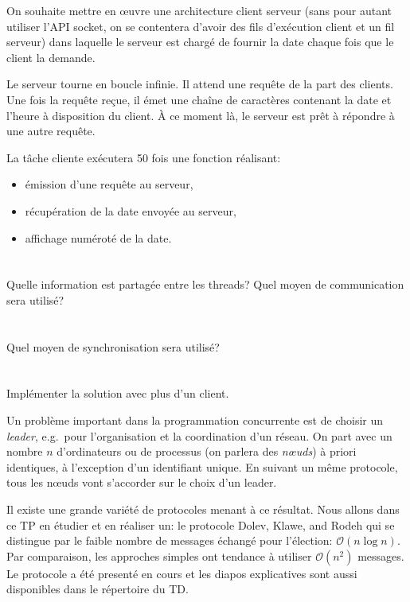 \documentclass{exam}
\begin{document}
\begin{questions}
\begin{solution}
  \inputminted{C}{correc/julia.c}
\end{solution}

On souhaite mettre en \oe{}uvre une architecture client serveur (sans pour
autant utiliser l'API socket, on se contentera d'avoir des fils d'exécution
client et un fil serveur) dans laquelle le serveur est chargé de
fournir la date chaque fois que le client la demande.

Le serveur tourne en boucle infinie. Il attend une requête de la part des
clients. Une fois la requête reçue, il émet une chaîne de caractères contenant
la date et l'heure à disposition du client. À ce moment là, le serveur est
prêt à répondre à une autre requête.

La tâche cliente exécutera 50 fois une fonction réalisant:
\begin{itemize}
  \item émission d'une requête au serveur,
  \item récupération de la date envoyée au serveur,
  \item affichage numéroté de la date.
\end{itemize}
\begin{parts}
  \part{} Quelle information est partagée entre les threads? Quel moyen de
  communication sera utilisé?
  \part{} Quel moyen de synchronisation sera utilisé?
  \part{} Implémenter la solution avec plus d'un client.
\end{parts}

Un problème important dans la programmation concurrente est de choisir
un \emph{leader}, e.g.\ pour l'organisation et la coordination d'un
réseau. On part avec un nombre $n$ d'ordinateurs ou de processus (on
parlera des \emph{nœuds}) à priori identiques, à l'exception d'un
identifiant unique. En suivant un même protocole, tous les nœuds vont
s'accorder sur le choix d'un leader.

Il existe une grande variété de protocoles menant à ce résultat.  Nous
allons dans ce TP en étudier et en réaliser un: le protocole Dolev,
Klawe, and Rodeh qui se distingue par le faible nombre de messages
échangé pour l'élection: $\mathcal{O}(n\log n)$. Par comparaison, les
approches simples ont tendance à utiliser $\mathcal{O}(n^2)$ messages.
Le protocole a été presenté en cours et les diapos explicatives sont
aussi disponibles dans le répertoire du TD.\@


\end{questions}
\end{document}
